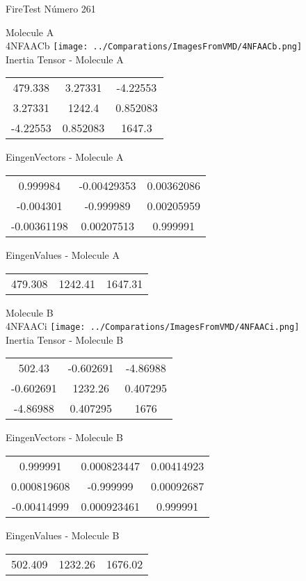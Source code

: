 \vtab[-2cm]
\begin{center}
{\large FireTest \tab Número 261}
\end{center}
\begin{multicols}{2}
\begin{center}

Molecule A \\ 
4NFAACb
\texttt{[image: ../Comparations/ImagesFromVMD/4NFAACb.png]}
\\
Inertia Tensor - Molecule A \\
\vtab

\begin{tabular}{|c c c|}
479.338	 & 	3.27331	 & 	-4.22553	 \\
3.27331	 & 	1242.4	 & 	0.852083	 \\
-4.22553	 & 	0.852083	 & 	1647.3
\end{tabular}

\vtab
 EingenVectors - Molecule A     \\
\vtab
\begin{tabular}{|c c c|}
0.999984	 & 	-0.00429353	 & 	0.00362086	 \\
-0.004301	 & 	-0.999989	 & 	0.00205959	 \\
-0.00361198	 & 	0.00207513	 & 	0.999991
\end{tabular}

\vtab
 EingenValues - Molecule A     \\
\vtab
\begin{tabular}{|c c c|}
479.308	 & 	1242.41	 & 	1647.31	 \\
\end{tabular}
\columnbreak

Molecule B \\ 
4NFAACi
\texttt{[image: ../Comparations/ImagesFromVMD/4NFAACi.png]}
\\
Inertia Tensor - Molecule B \\
\vtab

\begin{tabular}{|c c c|}
502.43	 & 	-0.602691	 & 	-4.86988	 \\
-0.602691	 & 	1232.26	 & 	0.407295	 \\
-4.86988	 & 	0.407295	 & 	1676
\end{tabular}

\vtab
 EingenVectors - Molecule B     \\
\vtab
\begin{tabular}{|c c c|}
0.999991	 & 	0.000823447	 & 	0.00414923	 \\
0.000819608	 & 	-0.999999	 & 	0.00092687	 \\
-0.00414999	 & 	0.000923461	 & 	0.999991
\end{tabular}

\vtab
 EingenValues - Molecule B     \\
\vtab
\begin{tabular}{|c c c|}
502.409	 & 	1232.26	 & 	1676.02	 \\
\end{tabular}

\end{center}
\end{multicols}
